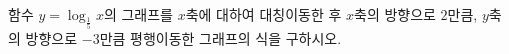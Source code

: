 함수 $y=\log_{\frac{1}{5}} x$의 그래프를 $x$축에 대하여 대칭이동한 후 $x$축의 방향으로 $2$만큼, $y$축의 방향으로 $-3$만큼 평행이동한 그래프의 식을 구하시오.
